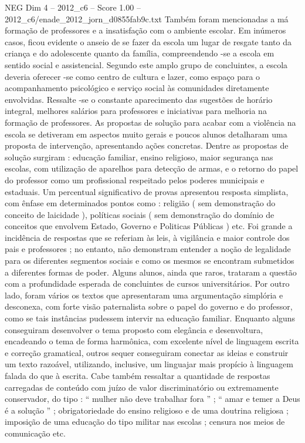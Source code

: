 \begin{textsample}{NEG Dim 4 – 2012\_c6 – Score 1.00 – 2012\_c6/enade\_2012\_jorn\_d0855fab9c.txt}
Também foram mencionadas a má formação de professores e a insatisfação com o ambiente escolar.
Em inúmeros casos, ficou evidente o anseio de se fazer da escola um lugar de resgate tanto da criança e do adolescente quanto da família, compreendendo -se a escola em sentido social e assistencial.
Segundo este amplo grupo de concluintes, a escola deveria oferecer -se como centro de cultura e lazer, como espaço para o acompanhamento psicológico e serviço social às comunidades diretamente envolvidas.
Ressalte -se o constante aparecimento das sugestões de horário integral, melhores salários para professores e iniciativas para melhoria na formação de professores.
As propostas de solução para acabar com a violência na escola se detiveram em aspectos muito gerais e poucos alunos detalharam uma proposta de intervenção, apresentando ações concretas.
Dentre as propostas de solução surgiram : educação familiar, ensino religioso, maior segurança nas escolas, com utilização de aparelhos para detecção de armas, e o retorno do papel do professor como um profissional respeitado pelos poderes municipais e estaduais.
Um percentual significativo de provas apresentou resposta simplista, com ênfase em determinados pontos como : religião ( sem demonstração do conceito de laicidade ), políticas sociais ( sem demonstração do domínio de conceitos que envolvem Estado, Governo e Politicas Públicas ) etc.
Foi grande a incidência de respostas que se referiam às leis, à vigilância e maior controle dos pais e professores ; no entanto, não demonstram entender a noção de legalidade para os diferentes segmentos sociais e como os mesmos se encontram submetidos a diferentes formas de poder.
Alguns alunos, ainda que raros, trataram a questão com a profundidade esperada de concluintes de cursos universitários.
Por outro lado, foram vários os textos que apresentaram uma argumentação simplória e desconexa, com forte visão paternalista sobre o papel do governo e do professor, como se tais instâncias pudessem intervir na educação familiar.
Enquanto alguns conseguiram desenvolver o tema proposto com elegância e desenvoltura, encadeando o tema de forma harmônica, com excelente nível de linguagem escrita e correção gramatical, outros sequer conseguiram conectar as ideias e construir um texto razoável, utilizando, inclusive, um linguajar mais propício à linguagem falada do que à escrita.
Cabe também ressaltar a quantidade de respostas carregadas de conteúdo com juízo de valor discriminatório ou extremamente conservador, do tipo : “ mulher não deve trabalhar fora ” ; “ amar e temer a Deus é a solução ” ; obrigatoriedade do ensino religioso e de uma doutrina religiosa ; imposição de uma educação do tipo militar nas escolas ; censura nos meios de comunicação etc.

\end{textsample}
